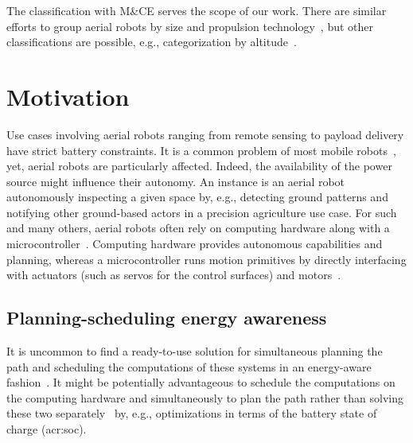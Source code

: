 The classification with M\&CE serves the scope of our work. There are similar efforts to group aerial robots by size and propulsion technology~\citep{hoffer2014survey,cabreira2019survey}, but other classifications are possible, e.g., categorization by altitude~\citep{watts2012unmanned}.


\section{Motivation}
\label{sec:motivation}

Use cases involving aerial robots ranging from remote sensing to payload delivery have strict battery constraints. It is a common problem of most mobile robots~\citep{mei2006energy}, yet, aerial robots are particularly affected. Indeed, the availability of the power source might influence their autonomy. An instance is an aerial robot autonomously inspecting a given space by, e.g., detecting ground patterns and notifying other ground-based actors in a precision agriculture use case. For such and many others, aerial robots often rely on computing hardware along with a microcontroller~\citep{dharmadhikari2020motion,william2019aerial,papachristos2015aerial,holper2017cyber}. Computing hardware provides autonomous capabilities and planning, whereas a microcontroller runs motion primitives by directly interfacing with actuators (such as servos for the control surfaces) and motors~\citep{mei2005case}.

\subsection{Planning-scheduling energy awareness}

It is uncommon to find a ready-to-use solution for simultaneous planning the path and scheduling the computations of these systems in an energy-aware fashion~\citep{brateman2006energy,sudhakar2020balancing}. %
It might be potentially advantageous to schedule the computations on the computing hardware and simultaneously to plan the path rather than solving these two separately~\citep{lahijanian2018resource,ondruska2015scheduled} by, e.g., optimizations in terms of the battery state of charge (\Gls{acr:soc}). 

